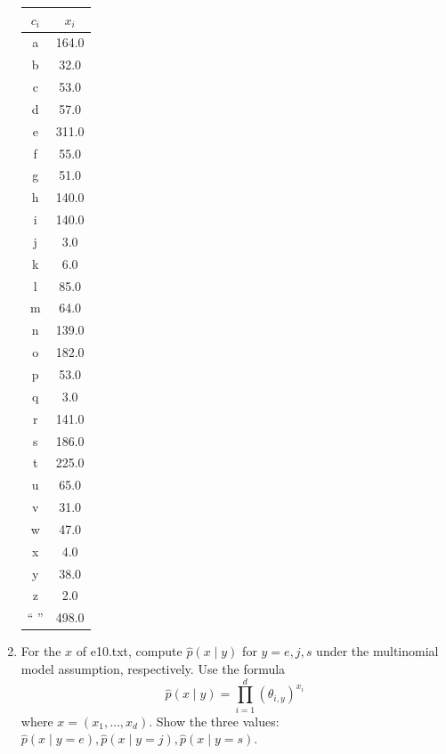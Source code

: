 \documentclass[a4paper]{article}
\theoremstyle{definition}
\newenvironment{soln}{
    \leavevmode\color{blue}\ignorespaces
}{}
\begin{document}
\begin{enumerate}
\begin{soln}
    \begin{center}
        \begin{tabular}{c | c}
            $c_i$ & $x_i$ \\ \hline
            a & 164.0 \\
            b & 32.0 \\
            c & 53.0 \\
            d & 57.0 \\
            e & 311.0 \\
            f & 55.0 \\
            g & 51.0 \\
            h & 140.0 \\
            i & 140.0 \\
            j & 3.0 \\
            k & 6.0 \\
            l & 85.0 \\
            m & 64.0 \\
            n & 139.0 \\
            o & 182.0 \\
            p & 53.0 \\
            q & 3.0 \\
            r & 141.0 \\
            s & 186.0 \\
            t & 225.0 \\
            u & 65.0 \\
            v & 31.0 \\
            w & 47.0 \\
            x & 4.0 \\
            y & 38.0 \\
            z & 2.0 \\
            `` '' & 498.0 \\
        \end{tabular}
    \end{center}
\end{soln}

\item
For the $x$ of e10.txt, compute $\hat p(x \mid y)$ for $y=e, j, s$ under the multinomial model assumption, respectively.
Use the formula
$$\hat p(x \mid y) = \prod_{i=1}^d (\theta_{i, y})^{x_i}$$
where $x=(x_1, \ldots, x_d)$.
Show the three values: $\hat p(x \mid y=e), \hat p(x \mid y=j), \hat p(x \mid y=s)$.


\end{enumerate}
\end{document}
